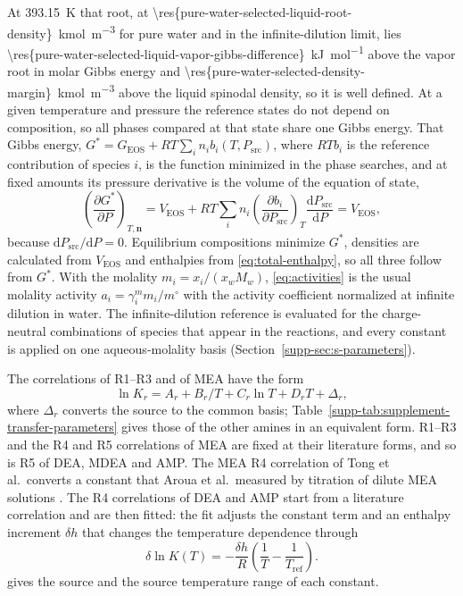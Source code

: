 At \SI{393.15}{\kelvin} that root, at \SI{\res{pure-water-selected-liquid-root-density}}{\kilo\mole\per\cubic\metre} for pure water and in the infinite-dilution \COtwo{} limit, lies \SI{\res{pure-water-selected-liquid-vapor-gibbs-difference}}{\kilo\joule\per\mole} above the vapor root in molar Gibbs energy and \SI{\res{pure-water-selected-density-margin}}{\kilo\mole\per\cubic\metre} above the liquid spinodal density, so it is well defined.
At a given temperature and pressure the reference states do not depend on composition, so all phases compared at that state share one Gibbs energy.
That Gibbs energy, $G^*=G_{\mathrm{EOS}}+RT\sum_in_ib_i(T,P_{\mathrm{src}})$, where $RTb_i$ is the reference contribution of species $i$, is the function minimized in the phase searches, and at fixed amounts its pressure derivative is the volume of the equation of state,
\begin{equation}
 \left(\frac{\partial G^*}{\partial P}\right)_{T,\boldsymbol n}=V_{\mathrm{EOS}}+RT\sum_in_i\left(\frac{\partial b_i}{\partial P_{\mathrm{src}}}\right)_T\frac{\mathrm{d}P_{\mathrm{src}}}{\mathrm{d}P}=V_{\mathrm{EOS}},
 \label{eq:pressure-tracking}
\end{equation}
because $\mathrm{d}P_{\mathrm{src}}/\mathrm{d}P=0$.
Equilibrium compositions minimize $G^*$, densities are calculated from $V_{\mathrm{EOS}}$ and enthalpies from \cref{eq:total-enthalpy}, so all three follow from $G^*$.
With the molality $m_i=x_i/(x_wM_w)$, \cref{eq:activities} is the usual molality activity $a_i=\gamma_i^mm_i/m^\circ$ with the activity coefficient normalized at infinite dilution in water.
The infinite-dilution reference is evaluated for the charge-neutral combinations of species that appear in the reactions, and every constant is applied on one aqueous-molality basis (Section~\ref{supp-sec:s-parameters}).

The correlations of R1--R3 and of MEA have the form \cite{Austgen1991}
\begin{equation}
 \ln K_r=A_r+B_r/T+C_r\ln T+D_rT+\Delta_r,
 \label{eq:reaction-equilibrium-constant-temperature}
\end{equation}
where $\Delta_r$ converts the source to the common basis; Table~\ref{supp-tab:supplement-transfer-parameters} gives those of the other amines in an equivalent form.
R1--R3 and the R4 and R5 correlations of MEA are fixed at their literature forms, and so is R5 of DEA, MDEA and AMP.
The MEA R4 correlation of Tong et al.\ converts a constant that Aroua et al.\ measured by titration of dilute MEA solutions \cite{Tong2012,arouaEquilibriumConstantCarbamate1999}.
The R4 correlations of DEA and AMP start from a literature correlation and are then fitted: the fit adjusts the constant term and an enthalpy increment $\delta h$ that changes the temperature dependence through
\begin{equation}
 \delta\ln K(T)=-\frac{\delta h}{R}\left(\frac1T-\frac1{T_{\mathrm{ref}}}\right).
 \label{eq:reaction-shift}
\end{equation}
 gives the source and the source temperature range of each constant.

